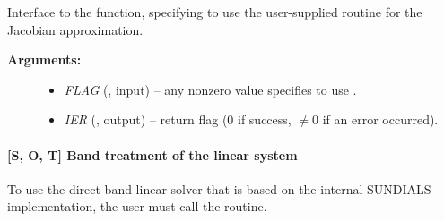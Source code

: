 \documentclass[letterpaper,10pt,english]{sphinxmanual}
\begin{document}
\begin{fulllineitems}
\label{f_interface/Usage:f/_/FARKDENSESETJAC}
Interface to the {\hyperref[c_interface/User_callable:c.ARKDlsSetDenseJacFn]{\emph{}}} function, specifying
to use the user-supplied routine {\hyperref[f_interface/Usage:f/_/FARKDJAC]{\emph{}}} for the
Jacobian approximation.
\begin{description}
\item[{\textbf{Arguments:}}] \leavevmode\begin{itemize}
\item {} 
\emph{FLAG} (, input) -- any nonzero value specifies to use
{\hyperref[f_interface/Usage:f/_/FARKDJAC]{\emph{}}}.

\item {} 
\emph{IER} (, output) -- return flag (0 if success,
\(\ne 0\) if an error occurred).

\end{itemize}

\end{description}

\end{fulllineitems}



\paragraph{{[}\textbf{S}, \textbf{O}, \textbf{T}{]} Band treatment of the linear system}
\label{f_interface/Usage:s-o-t-band-treatment-of-the-linear-system}
To use the direct band linear solver that is based on the internal
SUNDIALS implementation, the user must call the {\hyperref[f_interface/Usage:f/_/FARKBAND]{\emph{}}}
routine.
\end{document}
